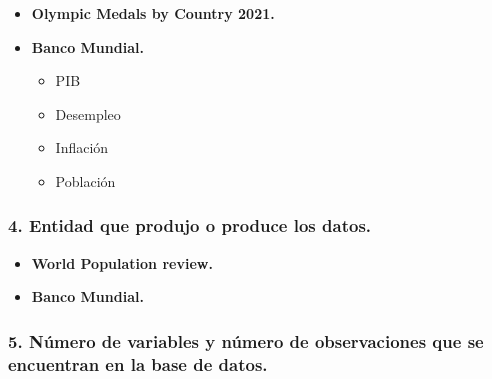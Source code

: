 \documentclass[
]{article}
\providecommand{\tightlist}{%
  \setlength{\itemsep}{0pt}\setlength{\parskip}{0pt}}
\begin{document}
\begin{itemize}
\item
  \textbf{Olympic Medals by Country 2021.}
\item
  \textbf{Banco Mundial.}

  \begin{itemize}
  \tightlist
  \item
    PIB
  \item
    Desempleo
  \item
    Inflación
  \item
    Población
  \end{itemize}
\end{itemize}

\hypertarget{entidad-que-produjo-o-produce-los-datos.}{%
\subsubsection{\texorpdfstring{\textbf{4.} Entidad que produjo o produce
los
datos.}{4. Entidad que produjo o produce los datos.}}\label{entidad-que-produjo-o-produce-los-datos.}}

\begin{itemize}
\item
  \textbf{World Population review.}
\item
  \textbf{Banco Mundial.}
\end{itemize}

\hypertarget{nuxfamero-de-variables-y-nuxfamero-de-observaciones-que-se-encuentran-en-la-base-de-datos.}{%
\subsubsection{\texorpdfstring{\textbf{5.} Número de variables y número
de observaciones que se encuentran en la base de
datos.}{5. Número de variables y número de observaciones que se encuentran en la base de datos.}}\label{nuxfamero-de-variables-y-nuxfamero-de-observaciones-que-se-encuentran-en-la-base-de-datos.}}
\end{document}
